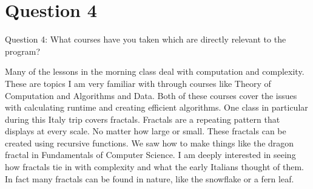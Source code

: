 \documentclass{article}
\begin{document}
\section{Question 4} Question 4: What courses have you taken which are directly
relevant to the program?

Many of the lessons in the morning class deal with computation and complexity.
These are topics I am very familiar with through courses like Theory of
Computation and Algorithms and Data. Both of these courses cover the issues with
calculating runtime and creating efficient algorithms. One class in particular
during this Italy trip covers fractals. Fractals are a repeating pattern that
displays at every scale. No matter how large or small. These fractals can be
created using recursive functions. We saw how to make things like the dragon
fractal in Fundamentals of Computer Science. I am deeply interested in seeing
how fractals tie in with complexity and what the early Italians thought of them.
In fact many fractals can be found in nature, like the snowflake or a fern leaf.
\end{document}
